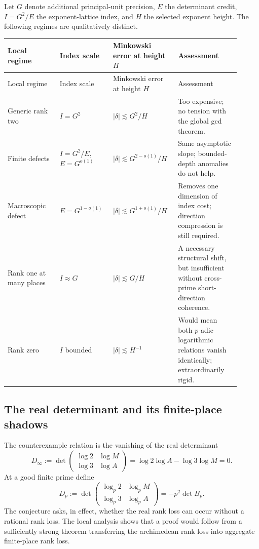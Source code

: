 \documentclass[11pt,oneside]{article}
\theoremstyle{definition}
\begin{document}
Let $G$ denote additional principal-unit precision, $E$ the determinant
credit, $I=G^2/E$ the exponent-lattice index, and $H$ the selected exponent
height.  The following regimes are qualitatively distinct.

\begin{longtable}{@{}p{0.21\linewidth}p{0.21\linewidth}p{0.24\linewidth}p{0.25\linewidth}@{}}
\toprule
Local regime & Index scale & Minkowski error at height $H$ & Assessment\\
\midrule
\endfirsthead
\toprule
Local regime & Index scale & Minkowski error at height $H$ & Assessment\\
\midrule
\endhead
Generic rank two & $I=G^2$ & $|\delta|\lesssim G^2/H$ & Too expensive; no tension with the global gcd theorem.\\
Finite defects & $I=G^2/E$, $E=G^{o(1)}$ & $|\delta|\lesssim G^{2-o(1)}/H$ & Same asymptotic slope; bounded-depth anomalies do not help.\\
Macroscopic defect & $E=G^{1-o(1)}$ & $|\delta|\lesssim G^{1+o(1)}/H$ & Removes one dimension of index cost; direction compression is still required.\\
Rank one at many places & $I\approx G$ & $|\delta|\lesssim G/H$ & A necessary structural shift, but insufficient without cross-prime short-direction coherence.\\
Rank zero & $I$ bounded & $|\delta|\lesssim H^{-1}$ & Would mean both $p$-adic logarithmic relations vanish identically; extraordinarily rigid.\\
\bottomrule
\end{longtable}

\subsection{The real determinant and its finite-place shadows}

The counterexample relation is the vanishing of the real determinant
\begin{equation}\label{eq:D-infty}
  D_\infty
  :=\det\begin{pmatrix}
    \log2&\log M\\
    \log3&\log A
  \end{pmatrix}
  =\log2\log A-\log3\log M=0.
\end{equation}
At a good finite prime define
\begin{equation}\label{eq:D-p}
  D_p
  :=\det\begin{pmatrix}
    \log_p2&\log_pM\\
    \log_p3&\log_pA
  \end{pmatrix}
  =-p^2\det B_p.
\end{equation}  The
conjecture asks, in effect, whether the real rank loss can occur without a
rational rank loss.  The local analysis shows that a proof would follow
from a sufficiently strong theorem transferring the archimedean rank loss
into aggregate finite-place rank loss.
\end{document}
